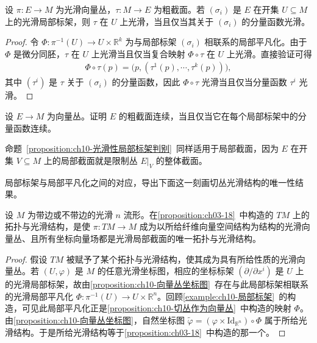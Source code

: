 \documentclass[../../main.tex]{subfiles}
\begin{document}
\begin{proposition}[光滑性的局部标架判别法]\label{proposition:ch10-光滑性局部标架判别}
设 $\pi\colon E\to M$ 为光滑向量丛，$\tau\colon M\to E$ 为粗截面。若 $(\sigma_i)$ 是 $E$ 在开集 $U\subseteq M$ 上的光滑局部标架，则 $\tau$ 在 $U$ 上光滑，当且仅当其关于 $(\sigma_i)$ 的分量函数光滑。
\end{proposition}

\begin{proof}
令 $\Phi\colon\pi^{-1}(U)\to U\times\mathbb{R}^k$ 为与局部标架 $(\sigma_i)$ 相联系的局部平凡化。由于 $\Phi$ 是微分同胚，$\tau$ 在 $U$ 上光滑当且仅当复合映射 $\Phi\circ\tau$ 在 $U$ 上光滑。直接验证可得
\begin{align*}
\Phi\circ\tau(p)=\big(p,(\tau^1(p),\cdots ,\tau^k(p))\big),
\end{align*}
其中 $(\tau^i)$ 是 $\tau$ 关于 $(\sigma_i)$ 的分量函数，因此 $\Phi\circ\tau$ 光滑当且仅当分量函数 $\tau^i$ 光滑。
\end{proof}

\begin{exercise}\label{exercise:ch10-23}
设 $E\to M$ 为向量丛。证明 $E$ 的粗截面连续，当且仅当它在每个局部标架中的分量函数连续。
\end{exercise}

命题~\ref{proposition:ch10-光滑性局部标架判别}~同样适用于局部截面，因为 $E$ 在开集 $V\subseteq M$ 上的局部截面就是限制丛 $E|_V$ 的整体截面。

局部标架与局部平凡化之间的对应，导出下面这一刻画切丛光滑结构的唯一性结果。

\begin{proposition}[切丛光滑结构的唯一性]\label{proposition:ch10-切丛光滑结构唯一性}
设 $M$ 为带边或不带边的光滑 $n$ 流形。在\cref{proposition:ch03-18}~中构造的 $TM$ 上的拓扑与光滑结构，是使 $\pi\colon TM\to M$ 成为以所给纤维向量空间结构为结构的光滑向量丛、且所有坐标向量场都是光滑局部截面的唯一拓扑与光滑结构。
\end{proposition}

\begin{proof}
假设 $TM$ 被赋予了某个拓扑与光滑结构，使其成为具有所给性质的光滑向量丛。若 $(U,\varphi)$ 是 $M$ 的任意光滑坐标图，相应的坐标标架 $(\partial/\partial x^i)$ 是 $U$ 上的光滑局部标架，故由\cref{proposition:ch10-向量丛坐标图}~存在与此局部标架相联系的光滑局部平凡化 $\Phi\colon\pi^{-1}(U)\to U\times\mathbb{R}^n$。回顾\cref{example:ch10-局部标架}~的构造，可见此局部平凡化正是\cref{proposition:ch10-切丛作为向量丛}~中构造的映射 $\Phi$。由\cref{proposition:ch10-向量丛坐标图}，自然坐标图 $\widetilde\varphi=(\varphi\times\mathrm{Id}_{\mathbb{R}^n})\circ\Phi$ 属于所给光滑结构。于是所给光滑结构等于\cref{proposition:ch03-18}~中构造的那一个。
\end{proof}
\end{document}
